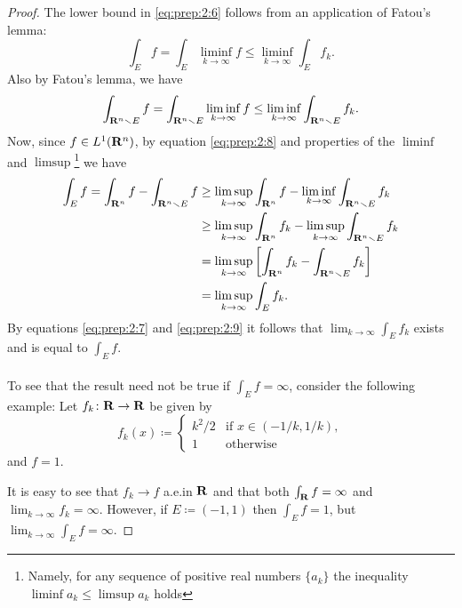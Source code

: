 \begin{proof}
The lower bound in \eqref{eq:prep:2:6} follows from an application of
Fatou's lemma:
\begin{equation}
  \label{eq:prep:2:7}
\int_E f=\int_E\liminf_{k\to\infty} f\leq\liminf_{k\to\infty}\int_E f_k.
\end{equation}
Also by Fatou's lemma, we have
\begin{equation}
  \label{eq:prep:2:8}
\int_{\mathbf{R}^n\smallsetminus E}f=\int_{\mathbf{R}^n\smallsetminus
  E}\liminf_{k\to\infty}f\leq\liminf_{k\to\infty}\int_{\mathbf{R}^n\smallsetminus E}f_k.
\end{equation}
Now, since $f\in L^1(\mathbf{R}^n)$, by equation \eqref{eq:prep:2:8} and
properties of the $\liminf$ and $\limsup$\footnote{Namely, for any sequence
  of positive real numbers $\{a_k\}$ the inequality $\liminf a_k\leq\limsup
  a_k$ holds} we have
\begin{equation}
\label{eq:prep:2:9}
\begin{aligned}
\int_Ef=\int_{\mathbf{R}^n}f-\int_{\mathbf{R}^n\smallsetminus E}f
&\geq\limsup_{k\to\infty}\int_{\mathbf{R}^n}f-\liminf_{k\to\infty}\int_{\mathbf{R}^n\smallsetminus
E}f_k\\
&\geq\limsup_{k\to\infty}\int_{\mathbf{R}^n}f_k-\limsup_{k\to\infty}\int_{\mathbf{R}^n\smallsetminus
  E}f_k\\
&=\limsup_{k\to\infty}\left[\int_{\mathbf{R}^n}f_k-\int_{\mathbf{R}^n\smallsetminus
    E}f_k\right]\\
&=\limsup_{k\to\infty}\int_Ef_k.
\end{aligned}
\end{equation}
By equations \eqref{eq:prep:2:7} and \eqref{eq:prep:2:9} it follows
that $\lim_{k\to\infty}\int_E f_k$ exists and is equal to $\int_E f$.
\\\\
To see that the result need not be true if $\int_Ef=\infty$, consider the
following example: Let $f_k\colon\mathbf{R}\to\mathbf{R}$ be given by
\begin{equation}
\label{eq:prep:2:11}
f_k(x)\coloneqq
\begin{cases}
k^2/2&\text{if $x\in(-1/k,1/k)$},\\
1&\text{otherwise}
\end{cases}
\end{equation}
and $f=1$.

It is easy to see that $f_k\to f$ a.e.\@ in $\mathbf{R}$ and that both $\int_{\mathbf{R}}
f=\infty$ and $\lim_{k\to\infty}f_k=\infty$. However, if $E\coloneqq(-1,1)$
then $\int_E f=1$, but $\lim_{k\to\infty}\int_Ef=\infty$.
\end{proof}

